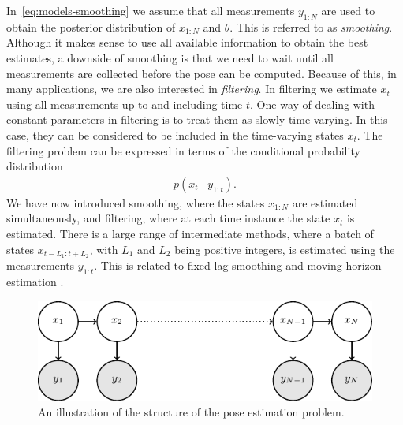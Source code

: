 In~\eqref{eq:models-smoothing} we assume that all measurements $y_{1:N}$ are used to obtain the posterior distribution of $x_{1:N}$ and $\theta$. This is referred to as \emph{smoothing}. Although it makes sense to use all available information to obtain the best estimates, a downside of smoothing is that we need to wait until all measurements are collected before the pose can be computed. Because of this, in many applications, we are also interested in \emph{filtering}. In filtering we estimate $x_t$ using all measurements up to and including time $t$. One way of dealing with constant parameters in filtering is to treat them as slowly time-varying. In this case, they can be considered to be included in the time-varying states $x_t$. The filtering problem can be expressed in terms of the conditional probability distribution
\begin{align}
\label{eq:models-filtering}
p(x_t \mid y_{1:t} ).
\end{align}
We have now introduced smoothing, where the states $x_{1:N}$ are estimated simultaneously, and filtering, where at each time instance the state $x_t$ is estimated. There is a large range of intermediate methods, where a batch of states $x_{t - L_1 : t + L_2}$, with $L_1$ and $L_2$ being positive integers, is estimated using the measurements $y_{1:t}$. This is related to fixed-lag smoothing and moving horizon estimation \citep{johansen:2011,raoRL:2001}.

\begin{figure}
  	\centering
    	\includegraphics[scale = 1]{figure3_2.pdf}
    	\caption{An illustration of the structure of the pose estimation problem.}
    	\label{fig:models-structureProblem}
\end{figure}

